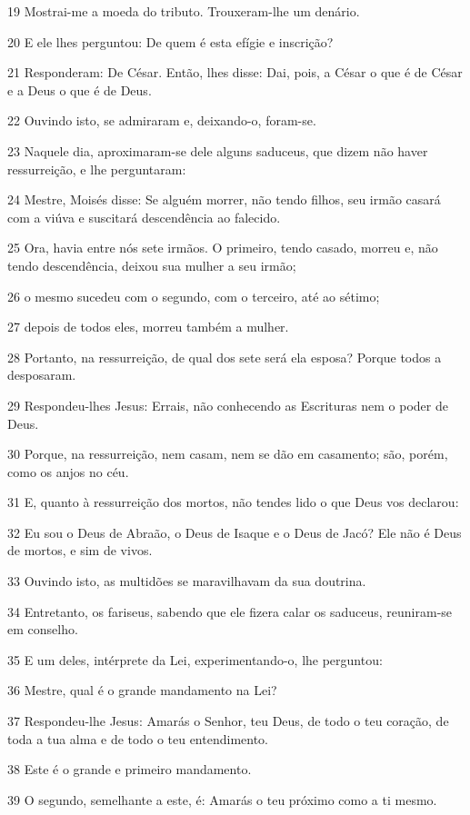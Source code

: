 \par 19 Mostrai-me a moeda do tributo. Trouxeram-lhe um denário.
\par 20 E ele lhes perguntou: De quem é esta efígie e inscrição?
\par 21 Responderam: De César. Então, lhes disse: Dai, pois, a César o que é de César e a Deus o que é de Deus.
\par 22 Ouvindo isto, se admiraram e, deixando-o, foram-se.
\par 23 Naquele dia, aproximaram-se dele alguns saduceus, que dizem não haver ressurreição, e lhe perguntaram:
\par 24 Mestre, Moisés disse: Se alguém morrer, não tendo filhos, seu irmão casará com a viúva e suscitará descendência ao falecido.
\par 25 Ora, havia entre nós sete irmãos. O primeiro, tendo casado, morreu e, não tendo descendência, deixou sua mulher a seu irmão;
\par 26 o mesmo sucedeu com o segundo, com o terceiro, até ao sétimo;
\par 27 depois de todos eles, morreu também a mulher.
\par 28 Portanto, na ressurreição, de qual dos sete será ela esposa? Porque todos a desposaram.
\par 29 Respondeu-lhes Jesus: Errais, não conhecendo as Escrituras nem o poder de Deus.
\par 30 Porque, na ressurreição, nem casam, nem se dão em casamento; são, porém, como os anjos no céu.
\par 31 E, quanto à ressurreição dos mortos, não tendes lido o que Deus vos declarou:
\par 32 Eu sou o Deus de Abraão, o Deus de Isaque e o Deus de Jacó? Ele não é Deus de mortos, e sim de vivos.
\par 33 Ouvindo isto, as multidões se maravilhavam da sua doutrina.
\par 34 Entretanto, os fariseus, sabendo que ele fizera calar os saduceus, reuniram-se em conselho.
\par 35 E um deles, intérprete da Lei, experimentando-o, lhe perguntou:
\par 36 Mestre, qual é o grande mandamento na Lei?
\par 37 Respondeu-lhe Jesus: Amarás o Senhor, teu Deus, de todo o teu coração, de toda a tua alma e de todo o teu entendimento.
\par 38 Este é o grande e primeiro mandamento.
\par 39 O segundo, semelhante a este, é: Amarás o teu próximo como a ti mesmo.
